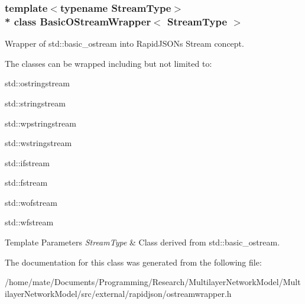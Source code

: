 \subsubsection*{template$<$typename Stream\+Type$>$\\*
class Basic\+O\+Stream\+Wrapper$<$ Stream\+Type $>$}

Wrapper of {\ttfamily std\+::basic\+\_\+ostream} into Rapid\+J\+S\+ON\textquotesingle{}s Stream concept. 

The classes can be wrapped including but not limited to\+:


\begin{DoxyItemize}
\item {\ttfamily std\+::ostringstream} 
\item {\ttfamily std\+::stringstream} 
\item {\ttfamily std\+::wpstringstream} 
\item {\ttfamily std\+::wstringstream} 
\item {\ttfamily std\+::ifstream} 
\item {\ttfamily std\+::fstream} 
\item {\ttfamily std\+::wofstream} 
\item {\ttfamily std\+::wfstream} 
\end{DoxyItemize}


\begin{DoxyTemplParams}{Template Parameters}
{\em Stream\+Type} & Class derived from {\ttfamily std\+::basic\+\_\+ostream}. \\
\hline
\end{DoxyTemplParams}


The documentation for this class was generated from the following file\+:\begin{DoxyCompactItemize}
\item 
/home/mate/\+Documents/\+Programming/\+Research/\+Multilayer\+Network\+Model/\+Multilayer\+Network\+Model/src/external/rapidjson/ostreamwrapper.\+h\end{DoxyCompactItemize}
